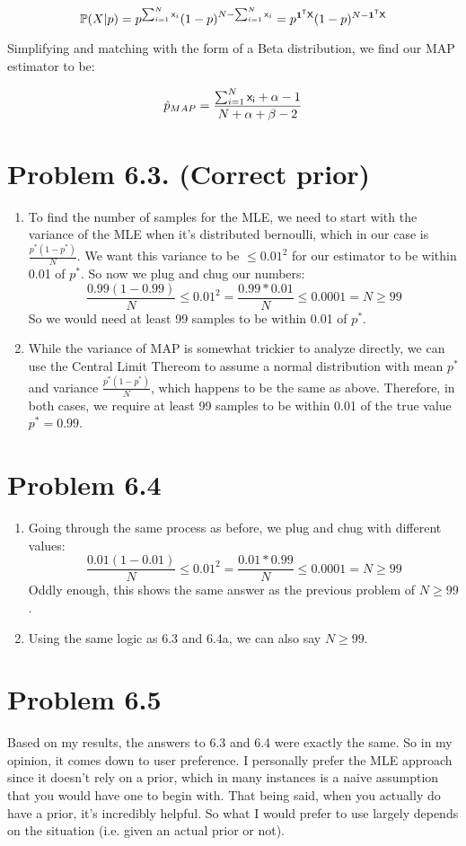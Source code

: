 \documentclass{article}
\begin{document}
\[ \mathbb{P}(X|p) = p^{\sum_{i=1}^{N} {\sf{x}}_i} (1 - p)^{N - \sum_{i=1}^{N} {\sf{x}}_i} =  p^{\textbf{1}^{{\sf{T}}}{\sf{X}}} (1 - p)^{N-\textbf{1}^{{\sf{T}}}{\sf{X}}} \]

Simplifying and matching with the form of a Beta distribution, we find our MAP estimator to be:

\[ \hat{p}_{MAP} = \frac{\sum_{i=1}^{N} {\sf{x}_i} + \alpha - 1}{N + \alpha + \beta - 2} \]

\section*{Problem 6.3. (Correct prior)}
  \begin{enumerate}[label=(\alph*)]
    \item To find the number of samples for the MLE, we need to start with the variance of the MLE when it's distributed bernoulli, which in our case is $\frac{p^*(1 - p^*)}{N}$. We want this variance to be $\le 0.01^2$ for our estimator to be within 0.01 of $p^*$. So now we plug and chug our numbers:
      \[ \frac{0.99(1 - 0.99)}{N} \le 0.01^2 = \frac{0.99 * 0.01}{N} \le 0.0001 = N \ge 99\]
    So we would need at least 99 samples to be within 0.01 of $p^*$.
    \item While the variance of MAP is somewhat trickier to analyze directly, we can use the Central Limit Thereom to assume a normal distribution with mean $p^*$ and variance $\frac{p^*(1 - p^*)}{N}$, which happens to be the same as above. Therefore, in both cases, we require at least 99 samples to be within 0.01 of the true value $p^* = 0.99$.
\end{enumerate}

\section*{Problem 6.4}
  \begin{enumerate}[label=(\alph*)]
    \item Going through the same process as before, we plug and chug with different values:
      \[ \frac{0.01(1 - 0.01)}{N} \le 0.01^2 = \frac{0.01 * 0.99}{N} \le 0.0001 = N \ge 99\]
    Oddly enough, this shows the same answer as the previous problem of $N \ge 99$.
    \item Using the same logic as 6.3 and 6.4a, we can also say $N \ge 99$.
\end{enumerate}

\section*{Problem 6.5}
Based on my results, the answers to 6.3 and 6.4 were exactly the same. So in my opinion, it comes down to user preference. I personally prefer the MLE approach since it doesn't rely on a prior, which in many instances is a naive assumption that you would have one to begin with. That being said, when you actually do have a prior, it's incredibly helpful. So what I would prefer to use largely depends on the situation (i.e. given an actual prior or not). 
\end{document}
